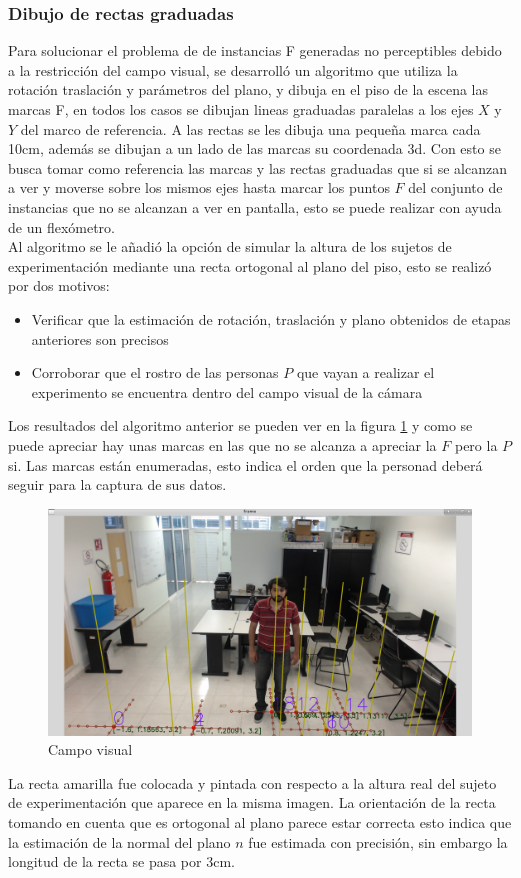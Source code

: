 \subsubsection{Dibujo de rectas graduadas}
Para solucionar el problema de de instancias F generadas no perceptibles debido a la restricción del campo visual, se desarrolló un algoritmo que utiliza la rotación traslación y parámetros del plano, y dibuja en el piso de la escena las marcas F, en todos los casos se dibujan lineas graduadas paralelas a los ejes $X$ y $Y$ del marco de referencia. A las rectas se les dibuja una pequeña marca cada 10cm, además se dibujan a un lado de las marcas su coordenada 3d. Con esto se busca tomar como referencia las marcas y las rectas graduadas que si se alcanzan a ver y moverse sobre los mismos ejes hasta marcar los puntos $F$ del conjunto de instancias que no se alcanzan a ver en pantalla, esto se puede realizar con ayuda de un flexómetro.\\
Al algoritmo se le añadió la opción de simular la altura de los sujetos de experimentación mediante una recta ortogonal al plano del piso, esto se realizó por dos motivos:
\begin{itemize}
	\item Verificar que la estimación de rotación, traslación y plano obtenidos de etapas anteriores son precisos
	\item Corroborar que el rostro de las personas $P$ que vayan a realizar el experimento se encuentra dentro del campo visual de la cámara
\end{itemize}
Los resultados del algoritmo anterior se pueden ver en la figura \ref{fig: figMarcasPiso} y como se puede apreciar hay unas marcas en las que no se alcanza a apreciar la $F$ pero la $P$ si. Las marcas están enumeradas, esto indica el orden que la personad deberá seguir para la captura de sus datos.\\
\begin{figure}[htbp] 
	\centering
	\includegraphics[width=.65\textwidth]{./pictures/marcasPiso}
	\caption{Campo visual}\label{fig: figMarcasPiso}
\end{figure}
La recta amarilla fue colocada y pintada con respecto a la altura real del sujeto de experimentación que aparece en la misma imagen. La orientación de la recta tomando en cuenta que es ortogonal al plano parece estar correcta esto indica que la estimación de la normal del plano $n$ fue estimada con precisión, sin embargo la longitud de la recta se pasa por 3cm.

